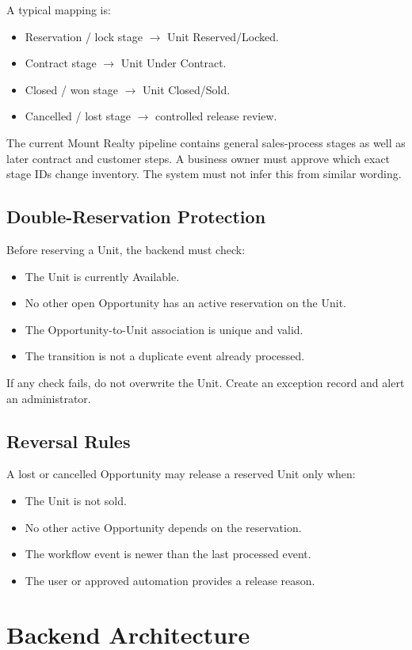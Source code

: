 \documentclass[10pt]{article}
\begin{document}
A typical mapping is:
\begin{itemize}
\item Reservation / lock stage $\rightarrow$ Unit Reserved/Locked.
\item Contract stage $\rightarrow$ Unit Under Contract.
\item Closed / won stage $\rightarrow$ Unit Closed/Sold.
\item Cancelled / lost stage $\rightarrow$ controlled release review.
\end{itemize}

The current Mount Realty pipeline contains general sales-process stages as well as later contract and customer steps. A business owner must approve which exact stage IDs change inventory. The system must not infer this from similar wording.

\subsection{Double-Reservation Protection}
Before reserving a Unit, the backend must check:
\begin{itemize}
\item The Unit is currently Available.
\item No other open Opportunity has an active reservation on the Unit.
\item The Opportunity-to-Unit association is unique and valid.
\item The transition is not a duplicate event already processed.
\end{itemize}

If any check fails, do not overwrite the Unit. Create an exception record and alert an administrator.

\subsection{Reversal Rules}
A lost or cancelled Opportunity may release a reserved Unit only when:
\begin{itemize}
\item The Unit is not sold.
\item No other active Opportunity depends on the reservation.
\item The workflow event is newer than the last processed event.
\item The user or approved automation provides a release reason.
\end{itemize}

\section{Backend Architecture}
\end{document}
